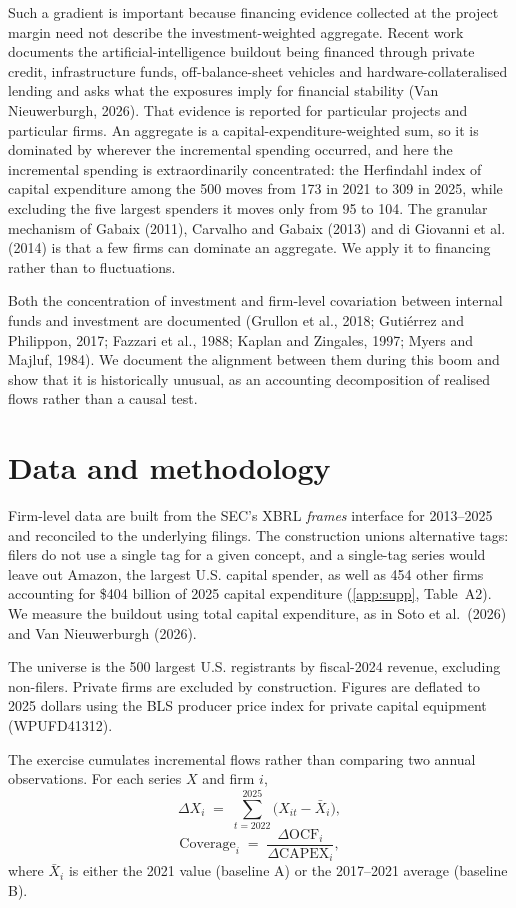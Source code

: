 \documentclass[preprint,11pt]{elsarticle}
\begin{document}
Such a gradient is important because financing evidence collected at the project margin need not
describe the investment-weighted aggregate. Recent work documents the artificial-intelligence
buildout being financed through private credit, infrastructure funds, off-balance-sheet vehicles and
hardware-collateralised lending and asks what the exposures imply for financial stability (Van
Nieuwerburgh, 2026). That evidence is reported for particular projects and particular firms. An
aggregate is a capital-expenditure-weighted sum, so it is dominated by wherever the incremental
spending occurred, and here the incremental spending is extraordinarily concentrated: the Herfindahl
index of capital expenditure among the 500 moves from 173 in 2021 to 309 in 2025, while excluding
the five largest spenders it moves only from 95 to 104. The granular mechanism of Gabaix (2011),
Carvalho and Gabaix (2013) and di Giovanni et al. (2014) is that a few firms can dominate an
aggregate. We apply it to financing rather than to fluctuations.

Both the concentration of investment and firm-level covariation between internal funds and
investment are documented (Grullon et al., 2018; Guti\'errez and Philippon, 2017; Fazzari et al.,
1988; Kaplan and Zingales, 1997; Myers and Majluf, 1984). We document the alignment between them
during this boom and show that it is historically unusual, as an accounting decomposition of
realised flows rather than a causal test.

\section{Data and methodology}
Firm-level data are built from the SEC's XBRL \emph{frames} interface for 2013--2025 and reconciled
to the underlying filings. The construction unions alternative tags: filers do not use a single tag
for a given concept, and a single-tag series would leave out Amazon, the largest U.S. capital
spender, as well as 454 other firms accounting for \$404 billion of 2025 capital expenditure
(\ref{app:supp}, Table~A2). We measure the buildout using total capital expenditure, as in Soto et
al.\ (2026) and Van Nieuwerburgh (2026).

The universe is the 500 largest U.S. registrants by fiscal-2024 revenue, excluding non-filers.
Private firms are excluded by construction. Figures are deflated to 2025 dollars using the BLS
producer price index for private capital equipment (WPUFD41312).

The exercise cumulates incremental flows rather than comparing two annual observations. For each
series $X$ and firm $i$,
\begin{equation}
\Delta X_i \;=\; \sum_{t=2022}^{2025}\bigl(X_{it}-\bar{X}_i\bigr),
\label{eq:cum}
\end{equation}
\begin{equation}
\mathrm{Coverage}_i \;=\; \frac{\Delta \mathrm{OCF}_i}{\Delta \mathrm{CAPEX}_i},
\label{eq:cov}
\end{equation}
where $\bar{X}_i$ is either the 2021 value (baseline A) or the 2017--2021 average (baseline B).
\end{document}
